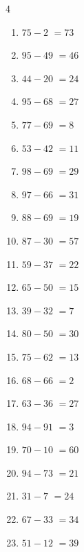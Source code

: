 \begin{multicols}{4}
\begin{enumerate}
  \item $75-2$
        $=73$

\columnbreak %

  \item $95-49$
        $=46$

  \item $44-20$
        $=24$

  \item $95-68$
        $=27$

  \item $77-69$
        $=8$

  \item $53-42$
        $=11$

  \item $98-69$
        $=29$

  \item $97-66$
        $=31$

  \item $88-69$
        $=19$

  \item $87-30$
        $=57$

  \item $59-37$
        $=22$

  \item $65-50$
        $=15$

  \item $39-32$
        $=7$

  \item $80-50$
        $=30$

  \item $75-62$
        $=13$

  \item $68-66$
        $=2$

  \item $63-36$
        $=27$

  \item $94-91$
        $=3$

  \item $70-10$
        $=60$

  \item $94-73$
        $=21$

  \item $31-7$
        $=24$

  \item $67-33$
        $=34$

  \item $51-12$
        $=39$


\end{enumerate}
\end{multicols}
